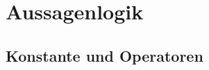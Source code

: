 
\section{Aussagenlogik}%
\label{sec:Aussagenlogik}

\subsection{Konstante und Operatoren}%
\label{sub:Operatoren}

